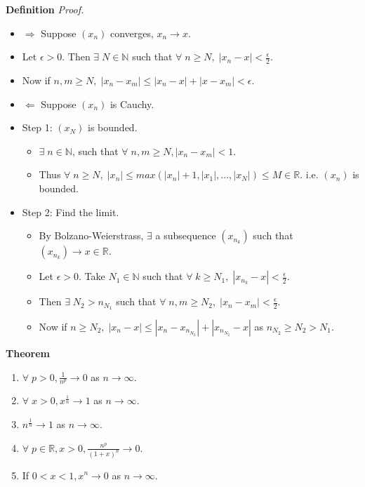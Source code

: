 \documentclass[12pt]{article}
\begin{document}
\begin{block}{\bf Definition}
{\sl Proof.}
\begin{itemize}
    \item $\Rightarrow$ Suppose $(x_n)$ converges, $x_n \rightarrow x$. 
    \item Let $\epsilon > 0$. Then $\exists\; N \in \mathbb{N}$ such that $\forall\;n\ge N,\; |x_n - x| < \frac{\epsilon}{2}.$
    \item Now if $n,m \ge N,\; |x_n - x_m| \le |x_n-x|+|x-x_m| < \epsilon.$\\
    
    \item $\Leftarrow$ Suppose $(x_n)$ is Cauchy.
    \item Step 1: $(x_N)$ is bounded.
    \begin{itemize}
        \item $\exists\; n \in \mathbb{N}$, such that $\forall\;n,m \ge N, |x_n-x_m|<1$.
        \item Thus $\forall\;n\ge N,\; |x_n| \le max(|x_n| +1, |x_1|,...,|x_N|)\le M\in\mathbb{R}$. \hfiill i.e. $(x_n)$ is bounded.
    \end{itemize}
    
    \item Step 2: Find the limit.
    \begin{itemize}
        \item By Bolzano-Weierstrass, $\exists$ a subsequence $(x_{n_k})$ such that $(x_{n_k}) \rightarrow x \in \mathbb{R}$.
        \item Let $\epsilon > 0$. Take $N_1 \in \mathbb{N}$ such that $\forall\; k\ge N_1,\; |x_{n_k} - x| <\frac{\epsilon}{2}.$
        \item Then $\exists\; N_2 > n_{N_1}$ such that $\forall\; n,m \ge N_2,\; |x_n -x_m| <\frac{\epsilon}{2}.$
        \item Now if $n \ge N_2,\; |x_n -x| \le |x_n -x_{n_{N_2}}| + |x_{n_{N_2}} - x|$ as $n_{N_2}\ge N_2 > N_1.$
    \end{itemize}
\end{itemize}



\textbf{Theorem}
\begin{enumerate}[label=(\roman*)]
    \item $\forall\;p>0, \frac{1}{n^p} \rightarrow 0$ as $n \rightarrow \infty$.
    \item $\forall\;x>0, x^{\frac{1}{n}} \rightarrow 1$ as $n \rightarrow \infty$.
    \item $n^{\frac{1}{n}} \rightarrow 1$ as $n \rightarrow \infty$.
    \item $\forall\; p\in \mathbb{R}, x>0, \frac{n^p}{(1+x)^n} \rightarrow 0$.
    \item If $0<x<1, x^n \rightarrow 0$ as $n \rightarrow \infty$.
\end{enumerate}


\end{block}
\end{document}
